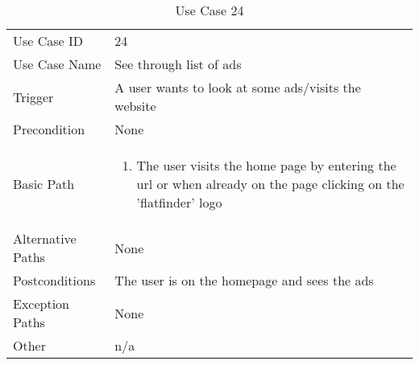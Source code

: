 \begin{table}[H]
\centering
\label{table-use-case-24}
\begin{tabular}{|p{3cm}|p{10cm}}
Use Case ID       & 24                                                           
\\
Use Case Name     & See through list of ads                                                         
\\
Trigger           & A user wants to look at some ads/visits the website                                          
\\
Precondition      & None                                                 
\\
Basic Path        & \begin{enumerate}
\item The user visits the home page by entering the url or when already on the
page clicking on the 'flatfinder' logo
\end{enumerate} 
     \\
Alternative Paths & None                          \\
Postconditions    & The user is on the homepage and sees the ads                                                          
\\
Exception Paths   & None                          \\
Other             & n/a                                                                                                                                                                                                        
\end{tabular}
\caption{Use Case 24}
\end{table}

